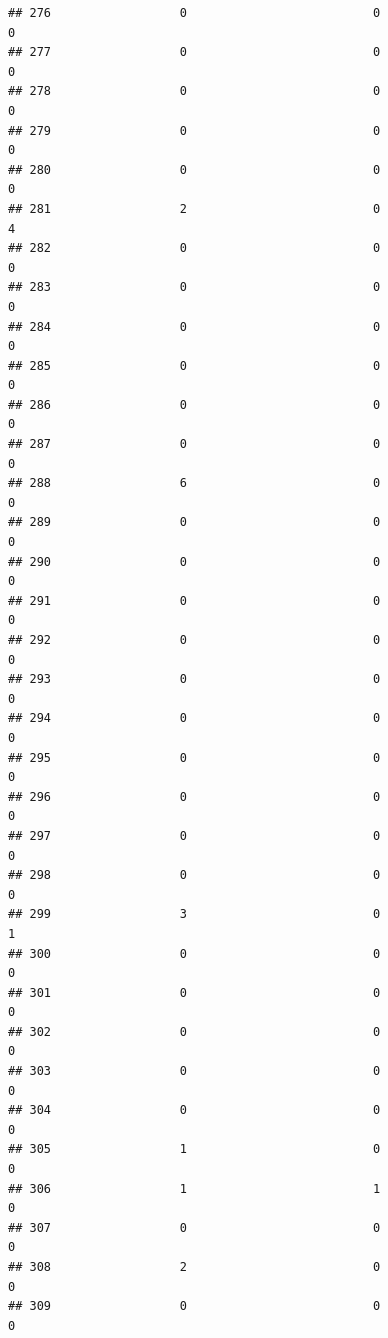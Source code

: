 \documentclass[
]{article}
\begin{document}
\begin{verbatim}
## 276                  0                          0                       0
## 277                  0                          0                       0
## 278                  0                          0                       0
## 279                  0                          0                       0
## 280                  0                          0                       0
## 281                  2                          0                       4
## 282                  0                          0                       0
## 283                  0                          0                       0
## 284                  0                          0                       0
## 285                  0                          0                       0
## 286                  0                          0                       0
## 287                  0                          0                       0
## 288                  6                          0                       0
## 289                  0                          0                       0
## 290                  0                          0                       0
## 291                  0                          0                       0
## 292                  0                          0                       0
## 293                  0                          0                       0
## 294                  0                          0                       0
## 295                  0                          0                       0
## 296                  0                          0                       0
## 297                  0                          0                       0
## 298                  0                          0                       0
## 299                  3                          0                       1
## 300                  0                          0                       0
## 301                  0                          0                       0
## 302                  0                          0                       0
## 303                  0                          0                       0
## 304                  0                          0                       0
## 305                  1                          0                       0
## 306                  1                          1                       0
## 307                  0                          0                       0
## 308                  2                          0                       0
## 309                  0                          0                       0

\end{verbatim}
\end{document}

